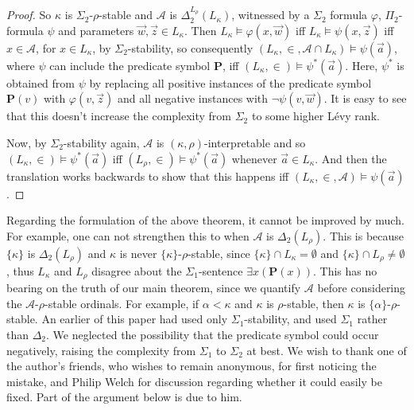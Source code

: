 \documentclass{article}
\theoremstyle{definition}
\theoremstyle{plain}
\theoremstyle{plain}
\theoremstyle{plain}
\theoremstyle{plain}
\theoremstyle{remark}
\theoremstyle{remark}
\theoremstyle{remark}
\theoremstyle{plain}
\theoremstyle{plain}
\theoremstyle{plain}
\begin{document}
\begin{proof}
So $\kappa$ is $\Sigma_2$-$\rho$-stable and $\mathcal{A}$ is $\Delta_2^{L_\rho}(L_\kappa)$, witnessed by a $\Sigma_2$ formula $\varphi$, $\Pi_2$-formula $\psi$ and parameters $\vec{w}, \vec{z} \in L_\kappa$. Then $L_\kappa \models \varphi(x, \vec{w})$ iff $L_\kappa \models \psi(x, \vec{z})$ iff $x \in \mathcal{A}$, for $x \in L_\kappa$, by $\Sigma_2$-stability, so consequently $(L_\kappa, \in, \mathcal{A} \cap L_\kappa) \models \psi(\vec{a})$, where $\psi$ can include the predicate symbol $\mathbf{P}$, iff $(L_\kappa, \in) \models \psi^*(\vec{a})$. Here, $\psi^*$ is obtained from $\psi$ by replacing all positive instances of the predicate symbol $\mathbf{P}(v)$ with $\varphi(v, \vec{z})$ and all negative instances with $\neg \psi(v, \vec{w})$. It is easy to see that this doesn't increase the complexity from $\Sigma_2$ to some higher Lévy rank.

Now, by $\Sigma_2$-stability again, $\mathcal{A}$ is $(\kappa, \rho)$-interpretable and so $(L_\kappa, \in) \models \psi^*(\vec{a})$ iff $(L_\rho, \in) \models \psi^*(\vec{a})$ whenever $\vec{a} \in L_\kappa$. And then the translation works backwards to show that this happens iff $(L_\kappa, \in, \mathcal{A}) \models \psi(\vec{a})$.
\end{proof}

Regarding the formulation of the above theorem, it cannot be improved by much. For example, one can not strengthen this to when $\mathcal{A}$ is $\Delta_2(L_\rho)$. This is because $\{\kappa\}$ is $\Delta_2(L_\rho)$ and $\kappa$ is never $\{\kappa\}$-$\rho$-stable, since $\{\kappa\} \cap L_\kappa = \emptyset$ and $\{\kappa\} \cap L_\rho \neq \emptyset$, thus $L_\kappa$ and $L_\rho$ disagree about the $\Sigma_1$-sentence $\exists x (\mathbf{P}(x))$. This has no bearing on the truth of our main theorem, since we quantify $\mathcal{A}$ before considering the $\mathcal{A}$-$\rho$-stable ordinals. For example, if $\alpha < \kappa$ and $\kappa$ is $\rho$-stable, then $\kappa$ is $\{\alpha\}$-$\rho$-stable. An earlier of this paper had used only $\Sigma_1$-stability, and used $\Sigma_1$ rather than $\Delta_2$. We neglected the possibility that the predicate symbol could occur negatively, raising the complexity from $\Sigma_1$ to $\Sigma_2$ at best. We wish to thank one of the author's friends, who wishes to remain anonymous, for first noticing the mistake, and Philip Welch for discussion regarding whether it could easily be fixed. Part of the argument below is due to him.
\end{document}
